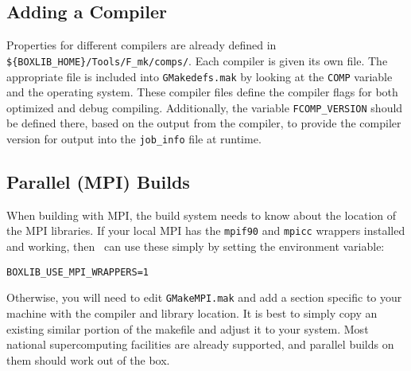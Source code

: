 \subsection{Adding a Compiler}

Properties for different compilers are already defined in {\tt
  \$\{BOXLIB\_HOME\}/Tools/F\_mk/comps/}.  Each compiler is given its
own file.  The appropriate file is included into {\tt GMakedefs.mak}
by looking at the {\tt COMP} variable and the operating system.  These
compiler files define the compiler flags for both optimized and debug
compiling.  Additionally, the variable {\tt FCOMP\_VERSION} should be
defined there, based on the output from the compiler, to provide the
compiler version for output into the {\tt job\_info} file at runtime.


\subsection{Parallel (MPI) Builds}

When building with MPI, the build system needs to know about the location of the
MPI libraries.  If your local MPI has the {\tt mpif90} and {\tt mpicc} wrappers
installed and working, then \maestro\ can use these simply by setting the
environment variable:
\begin{verbatim}
BOXLIB_USE_MPI_WRAPPERS=1
\end{verbatim}
Otherwise, you will need to edit {\tt GMakeMPI.mak} and add a section
specific to your machine with the compiler and library location.  It
is best to simply copy an existing similar portion of the makefile and
adjust it to your system.  Most national supercomputing facilities are
already supported, and parallel builds on them should work out of the
box.



